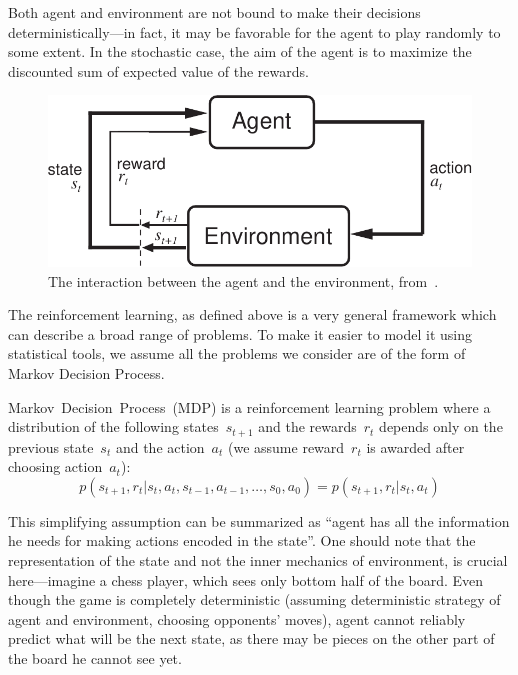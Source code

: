 Both agent and environment are not bound to make their decisions deterministically---in fact, it may be favorable for the agent to play randomly to some extent. In the stochastic case, the aim of the agent is to maximize the discounted sum of expected value of the rewards.

\begin{figure}[!h]
  \center
  \includegraphics[scale=0.8]{images/Agent-Env-crop.pdf}
  \caption{The interaction between the agent and the environment, from~\cite{reinforcement-book}.}
\end{figure}

The reinforcement learning, as defined above is a very general framework which can describe a broad range of problems. To make it easier to model it using statistical tools, we assume all the problems we consider are of the form of Markov Decision Process.

Markov~Decision~Process~(MDP) is a reinforcement learning problem where a distribution of the following states~$s_{t+1}$ and the rewards~$r_t$ depends only on the previous state~$s_t$ and the action~$a_t$ (we assume reward~$r_t$ is awarded after choosing action~$a_t$):
\begin{equation} \label{mdp}
  p(s_{t+1}, r_t|s_t, a_t, s_{t-1}, a_{t-1}, \ldots, s_0, a_0) = p(s_{t+1}, r_t|s_t, a_t)
\end{equation}

This simplifying assumption can be summarized as ``agent has all the information he needs for making actions encoded in the state''. One should note that the representation of the state and not the inner mechanics of environment, is crucial here---imagine a chess player, which sees only bottom half of the board. Even though the game is completely deterministic (assuming deterministic strategy of agent and environment, choosing opponents' moves), agent cannot reliably predict what will be the next state, as there may be pieces on the other part of the board he cannot see yet.

